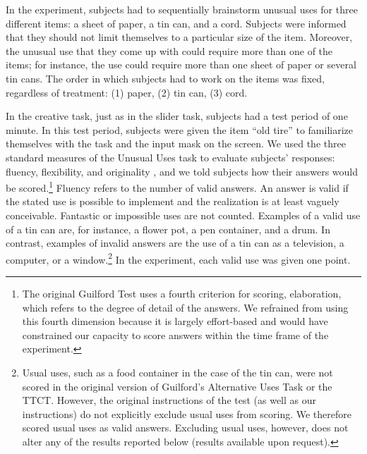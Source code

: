 
In the experiment, subjects had to sequentially brainstorm unusual uses for three different items:
a sheet of paper, a tin can, and a cord.
Subjects were informed that they should not limit themselves to a 
particular size of the item. Moreover, the unusual use that they come up with could 
require more than one of the items; for instance,
the use could require more than one sheet of paper or several tin cans.
The order in which subjects had to work on the items was fixed, regardless of treatment: (1) paper, (2) 
 tin can, (3) cord.%

In the creative task, just as in the slider task, subjects had a test period of one minute. 
In this test period, subjects were given the item ``old tire'' to familiarize themselves with 
the task and the input mask on the screen.
We used the three standard measures of the Unusual Uses task to evaluate subjects' responses:
fluency, flexibility, and originality \citep{Guilford1959}, and we told subjects how their answers would be scored.\footnote{The original Guilford Test 
uses a fourth criterion for scoring, elaboration, which refers to the degree of detail
of the answers. We refrained from using this fourth dimension because it is largely 
effort-based and would have constrained our capacity to score answers 
within the time frame of the experiment.} Fluency refers to the number of valid answers. 
An answer is valid if the stated use is possible to implement 
and the realization is at least vaguely conceivable.
Fantastic or impossible uses are not counted. 
Examples of a valid use of a tin can are, for instance, a flower pot, 
a pen container, and a drum. In contrast, examples of invalid answers are 
the use of a tin can as a television, a computer, or a window.\footnote{Usual uses, 
such as a food  container in the case of the tin can, were not scored in the original version of 
Guilford's Alternative Uses Task or the TTCT. However, the original instructions of the 
test (as well as our instructions) do not explicitly exclude usual uses from scoring. 
We therefore scored usual uses as valid answers. Excluding usual uses, however, does 
not alter any of the results reported below (results available upon request).}
In the experiment, each valid use was given one point.


